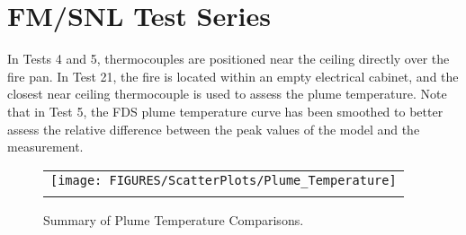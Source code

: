\section{FM/SNL Test Series}

In Tests 4 and 5, thermocouples are positioned near the ceiling directly over the fire pan.
In Test 21, the fire is located within an empty electrical cabinet, and the closest near ceiling thermocouple
is used to assess the plume temperature.  Note that in Test 5, the FDS plume temperature curve has been smoothed
to better assess the relative difference between the peak values of the model and the measurement.




\begin{figure}[p]
\begin{center}
\begin{tabular}{c}
\texttt{[image: FIGURES/ScatterPlots/Plume\_Temperature]} \\
\vspace{0.25in} \\
\end{tabular}
\caption{Summary of Plume Temperature Comparisons.}
\end{center}
\label{Plume_Summary}
\end{figure}
\clearpage
